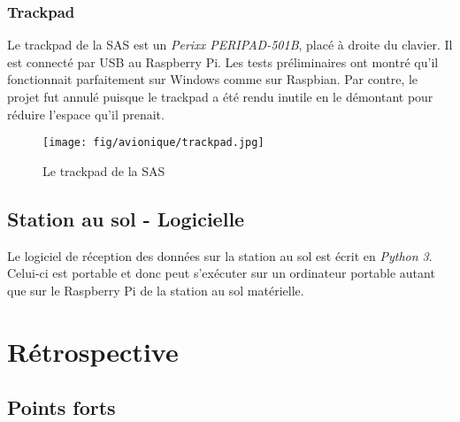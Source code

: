 \subsubsection{Trackpad}

Le trackpad de la SAS est un \textit{Perixx PERIPAD-501B}, placé à droite du
clavier. Il est connecté par USB au Raspberry Pi. Les tests préliminaires ont
montré qu'il fonctionnait parfaitement sur Windows comme sur Raspbian. Par
contre, le projet fut annulé puisque le trackpad a été rendu inutile en le
démontant pour réduire l'espace qu'il prenait.

\begin{figure}[H]
	\center
	\texttt{[image: fig/avionique/trackpad.jpg]}
	\caption{Le trackpad de la SAS}
	\label{f:trackpad}
\end{figure}

\subsection{Station au sol - Logicielle}

Le logiciel de réception des données sur la station au sol est écrit en
\textit{Python 3}. Celui-ci est portable et donc peut s'exécuter sur un
ordinateur portable autant que sur le Raspberry Pi de la station au sol
matérielle.

\section{Rétrospective}

\subsection{Points forts}


